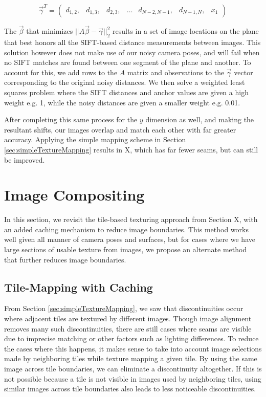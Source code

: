 \documentclass[]{spie}  %
\begin{document}
\[
\vec{\gamma}^T =
\begin{pmatrix}
  d_{1,2}, &d_{1,3}, &d_{2,3}, &\hdots &d_{N-2,N-1}, &d_{N-1,N}, &x_1
\end{pmatrix}
\]

The $\vec{\beta}$ that minimizes $||A \vec{\beta} -
\vec{\gamma}||_2^2$ results in a set of image locations on the plane
that best honors all the SIFT-based distance measurements between
images. This solution however does not make use of our noisy camera
poses, and will fail when no SIFT matches are found between one
segment of the plane and another. To account for this, we add rows to
the $A$ matrix and observations to the $\vec{\gamma}$ vector
corresponding to the original noisy distances. We then solve a
weighted least squares problem where the SIFT distances and anchor
values are given a high weight e.g. 1, while the noisy distances are
given a smaller weight e.g. 0.01.

After completing this same process for the $y$ dimension as well, and
making the resultant shifts, our images overlap and match each other
with far greater accuracy. Applying the simple mapping scheme in
Section \ref{sec:simpleTextureMapping} results in X, which has far
fewer seams, but can still be improved.

\section{Image Compositing}

In this section, we revisit the tile-based texturing approach from
Section X, with an added caching mechanism to reduce image
boundaries. This method works well given all manner of camera poses and
surfaces, but for cases where we have large sections of usable texture
from images, we propose an alternate method that further reduces image
boundaries.

\subsection{Tile-Mapping with Caching}
\label{sec:mappingWithCaching}
From Section \ref{sec:simpleTextureMapping}, we saw that
discontinuities occur where adjacent tiles are textured by different
images. Though image alignment removes many such discontinuities,
there are still cases where seams are visible due to imprecise
matching or other factors such as lighting differences. To reduce the
cases where this happens, it makes sense to take into account image
selections made by neighboring tiles while texture mapping a given
tile. By using the same image across tile boundaries, we can eliminate
a discontinuity altogether. If this is not possible because a tile is
not visible in images used by neighboring tiles, using similar images
across tile boundaries also leads to less noticeable discontinuities.
\end{document}
